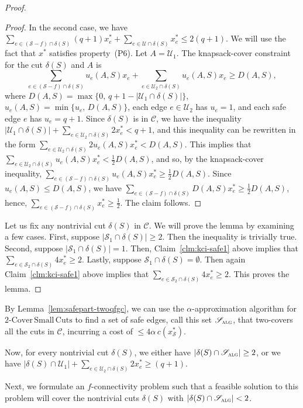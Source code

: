 \documentclass[11pt]{article}
\newcommand{\safe}{\mathscr{S}}
\newcommand{\unsafe}{\mathscr{U}}
\newcommand{\C}{\mathscr{C}}
\newcommand{\alg}{\textsc{alg}}
\newcommand\twoASC{\mathrm{2\text{-}Cover\,Small\,Cuts}}
\begin{document}
{{{\begin{proof}
\begin{proof}
In the second case, we have
$\sum_{e\in(\safe-f)\cap\delta(S)} (q+1) x^*_e +
\sum_{e\in\unsafe\cap\delta(S)} x^*_e \leq 2(q+1)$.
We will use the fact that $x^*$ satisfies property~(P6).
Let $A = \unsafe_1$.
The knapsack-cover constraint for the cut $\delta(S)$ and $A$ is
\[
\sum_{e\in (\safe - f)\cap\delta(S)} u_e(A,S) x_e +
        \sum_{e\in \unsafe_{2}\cap\delta(S)} u_e(A,S) x_e \geq D(A,S),
\]
where $D(A,S) =
        \max\{0,\, q+1-|\unsafe_1\cap\delta(S)|\}$,
$u_e(A,S) = \min\{u_e,\, D(A,S)\}$, each edge $e\in\unsafe_2$ has $u_e=1$,
and each safe edge $e$ has $u_e=q+1$.
Since $\delta(S)$ is in $\C$, we have the inequality
$|\unsafe_1\cap\delta(S)| + \sum_{e\in \unsafe_{2}\cap\delta(S)} {2} x^*_e < q+1$,
and this inequality can be rewritten in the form
$\sum_{e\in \unsafe_{2}\cap\delta(S)} {2} u_e(A,S) x^*_e < D(A,S)$.
This implies that
$\sum_{e\in \unsafe_{2}\cap\delta(S)} u_e(A,S) x^*_e < \frac{1}{2} D(A,S)$,
and so, by the knapsack-cover inequality,
$\sum_{e\in (\safe-f)\cap\delta(S)} u_e(A,S) x^*_e \geq \frac{1}{2} D(A,S)$.
Since $u_e(A,S) \leq D(A,S)$, we have
$\sum_{e\in (\safe-f)\cap\delta(S)} D(A,S) x^*_e \geq \frac{1}{2} D(A,S)$, hence,
$\sum_{e\in (\safe-f)\cap\delta(S)} x^*_e \geq \frac{1}{2}$.
The claim follows.
\end{proof}

Let us fix any nontrivial cut $\delta(S)$ in $\C$.
We will prove the lemma by examining a few cases.
First, suppose $|\safe_1\cap\delta(S)| \geq 2$. Then the inequality
is trivially true. Second, suppose $|\safe_1\cap\delta(S)|=1$.
Then, Claim~\ref{clm:kci-safe1}
above implies that $\sum_{e\in \safe_2\cap\delta(S)} 4x^*_e\geq2$.
Lastly, suppose $\safe_1\cap\delta(S) = \emptyset$. Then again
Claim~\ref{clm:kci-safe1} above implies that
$\sum_{e\in\safe_2\cap\delta(S)} 4x^*_e \geq 2$.
This proves the lemma.
\end{proof}
}


By Lemma~\ref{lem:safepart-twoqfgc}, we can use the $\alpha$-approximation
algorithm for $\twoASC$ to find a set of safe edges, call this set
$\safe_{\alg}$, that two-covers all the cuts in $\C$, incurring a
cost of $\leq4\alpha\, c(x^*_{\safe})$.


Now, for every nontrivial cut $\delta(S)$,
we either have $|\delta(S)\cap\safe_{\alg}|\geq2$, or we have
$|\delta(S)\cap\unsafe_1| + \sum_{e\in \unsafe_2 \cap\delta(S)} 2x^*_e \geq (q+1)$.

Next, we formulate an $f$-connectivity problem such that
a feasible solution to this problem will cover the nontrivial
cuts $\delta(S)$ with $|\delta(S)\cap\safe_{\alg}|<2$.

}}
\end{document}
